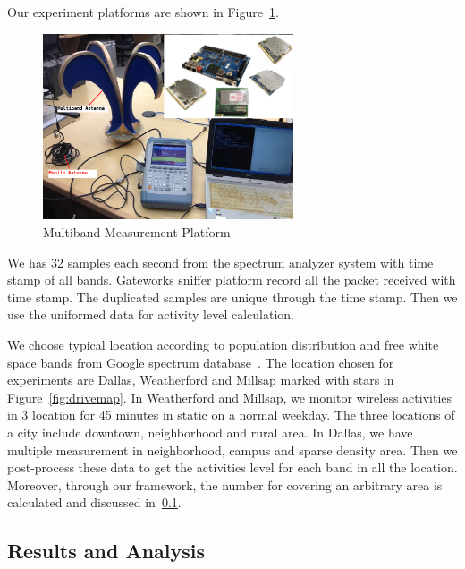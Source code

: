 Our experiment platforms are shown in Figure~\ref{fig:equipment}.
  \begin{figure}
  \centering
  \includegraphics[width=74mm]{figures/equipment}
  \vspace{-0.1in}
  \caption{Multiband Measurement Platform}                                                                 
  \label{fig:equipment}
  \end{figure}
We has 32 samples each second from the spectrum analyzer system with time stamp of all bands.
Gateworks sniffer platform record all the packet received with time stamp. The duplicated 
samples are unique through the time stamp. Then we use the uniformed data for activity level
 calculation.  

We choose typical location according to population distribution and free white space bands 
from Google spectrum database~\cite{googledatabase}. The location chosen for experiments 
are Dallas, Weatherford and Millsap marked with stars in Figure~\ref{fig:drivemap}.
In Weatherford and Millsap, we monitor wireless activities in 3 location for 45 minutes in 
static on a normal weekday. The three locations of a city include downtown, neighborhood and 
rural area. In Dallas, we have multiple measurement in neighborhood, campus and sparse density area.
Then we post-process these data to get the activities level for each band in all the location.
Moreover, through our framework, the number for covering an arbitrary area is calculated and discussed in~\ref{subsec:result}.



\subsection{Results and Analysis} 
\label{subsec:result}

